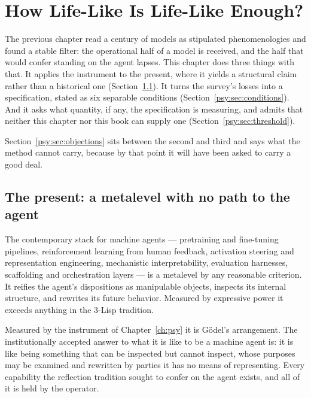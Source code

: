 \chapter{How Life-Like Is Life-Like Enough?}
\label{ch:psy2}

The previous chapter read a century of models as stipulated
phenomenologies and found a stable filter: the operational half of a
model is received, and the half that would confer standing on the
agent lapses.
This chapter does three things with that.
It applies the instrument to the present, where it yields a
structural claim rather than a historical one
(Section~\ref{psy:sec:present}).
It turns the survey's losses into a specification, stated as six
separable conditions (Section~\ref{psy:sec:conditions}).
And it asks what quantity, if any, the specification is measuring,
and admits that neither this chapter nor this book can supply one
(Section~\ref{psy:sec:threshold}).

Section~\ref{psy:sec:objections} sits between the second and third
and says what the method cannot carry, because by that point it will
have been asked to carry a good deal.

\section{The present: a metalevel with no path to the agent}
\label{psy:sec:present}

The contemporary stack for machine agents --- pretraining and
fine-tuning pipelines, reinforcement learning from human feedback,
activation steering and representation engineering, mechanistic
interpretability, evaluation harnesses, scaffolding and
orchestration layers --- is a metalevel by any reasonable criterion.
It reifies the agent's dispositions as manipulable objects, inspects
its internal structure, and rewrites its future behavior.
Measured by expressive power it exceeds anything in the 3-Lisp
tradition.

Measured by the instrument of Chapter~\ref{ch:psy} it is G\"odel's
arrangement.
The institutionally accepted answer to what it is like to be a
machine agent is: it is like being something that can be inspected
but cannot inspect, whose purposes may be examined and rewritten by
parties it has no means of representing.
Every capability the reflection tradition sought to confer on the
agent exists, and all of it is held by the operator.

